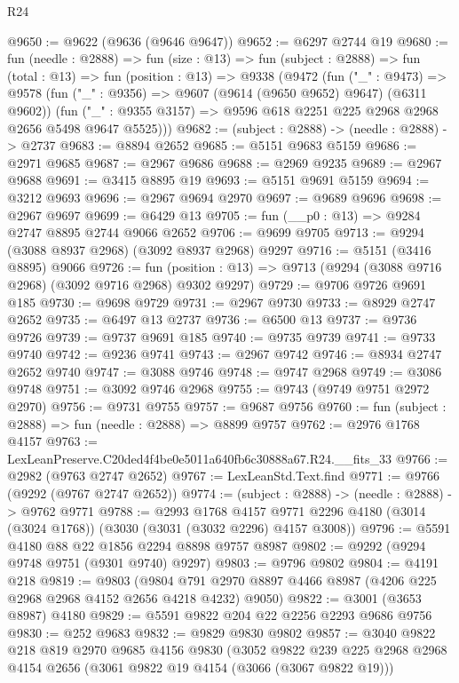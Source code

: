 \begin{lexlean}{R24}
\begin{coremodule}
@9650 := @9622 (@9636 (@9646 @9647))
@9652 := @6297 @2744 @19
@9680 := fun (needle : @2888) =>
  fun (size : @13) =>
  fun (subject : @2888) =>
  fun (total : @13) =>
  fun (position : @13) =>
  @9338
    (@9472
      (fun ("_" : @9473) =>
      @9578
        (fun ("_" : @9356) => @9607 (@9614 (@9650 @9652) @9647) (@6311 @9602))
        (fun ("_" : @9355 @3157) => @9596 @618 @2251 @225 @2968 @2968 @2656 @5498 @9647 @5525)))
@9682 := (subject : @2888) -> (needle : @2888) -> @2737
@9683 := @8894 @2652
@9685 := @5151 @9683 @5159
@9686 := @2971 @9685
@9687 := @2967 @9686
@9688 := @2969 @9235
@9689 := @2967 @9688
@9691 := @3415 @8895 @19
@9693 := @5151 @9691 @5159
@9694 := @3212 @9693
@9696 := @2967 @9694 @2970
@9697 := @9689 @9696
@9698 := @2967 @9697
@9699 := @6429 @13
@9705 := fun (__p0 : @13) => @9284 @2747 @8895 @2744 @9066 @2652
@9706 := @9699 @9705
@9713 := @9294 (@3088 @8937 @2968) (@3092 @8937 @2968) @9297
@9716 := @5151 (@3416 @8895) @9066
@9726 := fun (position : @13) => @9713 (@9294 (@3088 @9716 @2968) (@3092 @9716 @2968) @9302 @9297)
@9729 := @9706 @9726 @9691 @185
@9730 := @9698 @9729
@9731 := @2967 @9730
@9733 := @8929 @2747 @2652
@9735 := @6497 @13 @2737
@9736 := @6500 @13
@9737 := @9736 @9726
@9739 := @9737 @9691 @185
@9740 := @9735 @9739
@9741 := @9733 @9740
@9742 := @9236 @9741
@9743 := @2967 @9742
@9746 := @8934 @2747 @2652 @9740
@9747 := @3088 @9746
@9748 := @9747 @2968
@9749 := @3086 @9748
@9751 := @3092 @9746 @2968
@9755 := @9743 (@9749 @9751 @2972 @2970)
@9756 := @9731 @9755
@9757 := @9687 @9756
@9760 := fun (subject : @2888) => fun (needle : @2888) => @8899 @9757
@9762 := @2976 @1768 @4157
@9763 := LexLeanPreserve.C20ded4f4be0e5011a640fb6c30888a67.R24.__fits_33
@9766 := @2982 (@9763 @2747 @2652)
@9767 := LexLeanStd.Text.find
@9771 := @9766 (@9292 (@9767 @2747 @2652))
@9774 := (subject : @2888) -> (needle : @2888) -> @9762 @9771
@9788 := @2993
    @1768
    @4157
    @9771
    @2296
    @4180
    (@3014 (@3024 @1768))
    (@3030 (@3031 (@3032 @2296) @4157 @3008))
@9796 := @5591 @4180 @88 @22 @1856 @2294 @8898 @9757 @8987
@9802 := @9292 (@9294 @9748 @9751 (@9301 @9740) @9297)
@9803 := @9796 @9802
@9804 := @4191 @218
@9819 := @9803
    (@9804 @791 @2970 @8897 @4466 @8987 (@4206 @225 @2968 @2968 @4152 @2656 @4218 @4232) @9050)
@9822 := @3001 (@3653 @8987) @4180
@9829 := @5591 @9822 @204 @22 @2256 @2293 @9686 @9756
@9830 := @252 @9683
@9832 := @9829 @9830 @9802
@9857 := @3040
    @9822
    @218
    @819
    @2970
    @9685
    @4156
    @9830
    (@3052
      @9822
      @239
      @225
      @2968
      @2968
      @4154
      @2656
      (@3061 @9822 @19 @4154 (@3066 (@3067 @9822 @19)))

\end{coremodule}
\end{lexlean}
